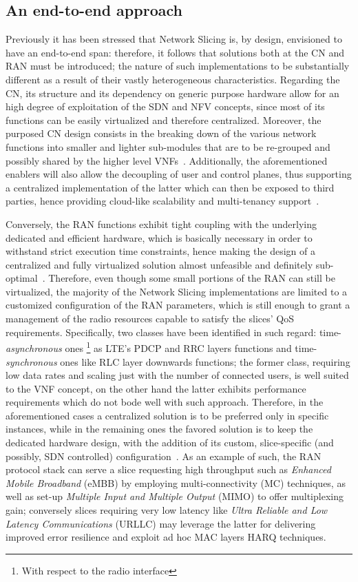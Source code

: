 \documentclass[11pt]{book}
\begin{document}
\subsection{An end-to-end approach}
Previously it has been stressed that Network Slicing is, by design, envisioned to have an end-to-end span: therefore, it follows that solutions both at the CN and RAN must be introduced; the nature of such implementations to be substantially different as a result of their vastly heterogeneous characteristics. Regarding the CN, its structure and its dependency on generic purpose hardware allow for an high degree of exploitation of the SDN and NFV concepts, since most of its functions can be easily virtualized and therefore centralized. Moreover, the purposed CN design consists in the breaking down of the various network functions into smaller and lighter sub-modules that are to be re-grouped and possibly shared by the higher level VNFs~\cite{An2017ArchitectureMF}. Additionally, the aforementioned enablers will also allow the decoupling of user and control planes, thus supporting a centralized implementation of the latter which can then be exposed to third parties, hence providing cloud-like scalability and multi-tenancy support~\cite{5gCrosshaul}.

Conversely, the RAN functions exhibit tight coupling with the underlying dedicated and efficient hardware, which is basically necessary in order to withstand strict execution time constraints, hence making the design of a centralized and fully virtualized solution almost unfeasible and definitely sub-optimal~\cite{kaloxylos2018survey}. Therefore, even though some small portions of the RAN can still be virtualized, the majority of the Network Slicing implementations are limited to a customized configuration of the RAN parameters, which is still enough to grant a management of the radio resources capable to satisfy the slices' QoS requirements. Specifically, two classes have been identified in such regard: time-\textit{asynchronous} ones \footnote{With respect to the radio interface} as LTE's PDCP and RRC layers functions and time-\textit{synchronous} ones like RLC layer downwards functions; the former class, requiring low data rates and scaling just with the number of connected users, is well suited to the VNF concept, on the other hand the latter exhibits performance requirements which do not bode well with such approach. Therefore, in the aforementioned cases a centralized solution is to be preferred only in specific instances, while in the remaining ones the favored solution is to keep the dedicated hardware design, with the addition of its custom, slice-specific (and possibly, SDN controlled) configuration~\cite{marsch20165g}. As an example of such, the RAN protocol stack can serve a slice requesting high throughput such as \textit{Enhanced Mobile Broadband} (eMBB) by employing multi-connectivity (MC) techniques, as well as set-up \textit{Multiple Input and Multiple Output} (MIMO) to offer multiplexing gain; conversely slices requiring very low latency like \textit{Ultra Reliable and Low Latency Communications} (URLLC) may leverage the latter for delivering improved error resilience and exploit ad hoc MAC layers HARQ techniques. 
\end{document}
